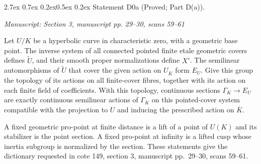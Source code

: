 \documentclass[11pt,a4paper]{article}
\makeatletter
\newcommand{\passage}[1]{\par\smallskip\noindent\textit{Manuscript: #1}\par\smallskip}
\renewcommand\paragraph{\@startsection{paragraph}{4}{\z@}%
  {2.7ex \@plus 0.7ex \@minus 0.2ex}{0.5ex \@plus 0.2ex}%
  {\normalfont\normalsize\bfseries}}
\makeatother
\begin{document}
\paragraph{Statement D0a (Proved; Part D(a)).}\label{res:D0a}
\passage{Section 3, manuscript pp. 29–30, scans 59–61}

Let $U/K$ be a hyperbolic curve in characteristic zero, with a geometric base point. The inverse system of all connected pointed finite etale geometric covers defines $\widetilde U$, and their smooth proper normalizations define $X'$. The semilinear automorphisms of $\widetilde U$ that cover the given action on $U_{\overline K}$ form $E_U$. Give this group the topology of its actions on all finite-cover fibres, together with its action on each finite field of coefficients. With this topology, continuous sections $\Gamma_K\to E_U$ are exactly continuous semilinear actions of $\Gamma_K$ on this pointed-cover system compatible with the projection to $U$ and inducing the prescribed action on $\overline K$.

A fixed geometric pro-point at finite distance is a lift of a point of $U(K)$ and its stabilizer is the point section. A fixed pro-point at infinity is a lifted cusp whose inertia subgroup is normalized by the section. These statements give the dictionary requested in cote 149, section 3, manuscript pp.~29--30, scans 59--61.
\end{document}
